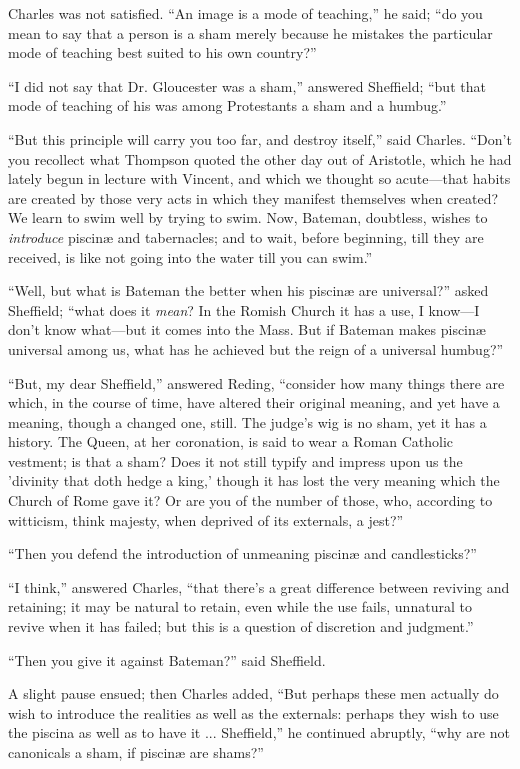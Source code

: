 Charles was not satisfied. ``An image is a mode of
teaching,'' he said; ``do you mean to say that a person is a sham merely because he mistakes the particular mode of teaching
best suited to his own country?''

``I did not say that Dr. Gloucester was a sham,'' answered
Sheffield; ``but that mode of teaching of his was among
Protestants a sham and a humbug.''

``But this principle will carry you too far, and destroy
itself,'' said Charles. ``Don't you recollect what Thompson
quoted the other day out of Aristotle, which he had lately begun in
lecture with Vincent, and which we thought so acute—that habits are
created by those very acts in which they manifest themselves when
created? We learn to swim well by trying to swim. Now, Bateman,
doubtless, wishes to \emph{introduce} piscinæ and tabernacles; and to
wait, before beginning, till they are received, is like not going into
the water till you can swim.''

``Well, but what is Bateman the better when his piscinæ are
universal?'' asked Sheffield; ``what does it \emph{mean}? In
the Romish Church it has a use, I know—I don't know what—but it
comes into the Mass. But if Bateman makes piscinæ universal among us,
what has he achieved but the reign of a universal humbug?''

``But, my dear Sheffield,'' answered Reding, ``consider
how many things there are which, in the course of time, have altered
their original meaning, and yet have a meaning, though a changed one,
still. The judge's wig is no sham, yet it has a history. The Queen, at
her coronation, is said to wear a Roman Catholic vestment; is that a
sham? Does it not still typify and impress upon us the 'divinity that
doth hedge a king,' though it has lost the very meaning which the
Church of Rome gave it? Or are you of the number of those, who,
according to witticism, think majesty, when deprived of its externals,
a jest?''

``Then you defend the introduction of unmeaning piscinæ and
candlesticks?''

``I think,'' answered Charles, ``that there's a great
difference between reviving and retaining; it may be natural to
retain, even while the use fails, unnatural to revive when it has
failed; but this is a question of discretion and judgment.''

``Then you give it against Bateman?'' said Sheffield.

A slight pause ensued; then Charles added, ``But perhaps these
men actually do wish to introduce the realities as well as the
externals: perhaps they wish to use the piscina as well as to have it
... Sheffield,'' he continued abruptly, ``why are not
canonicals a sham, if piscinæ are shams?''

